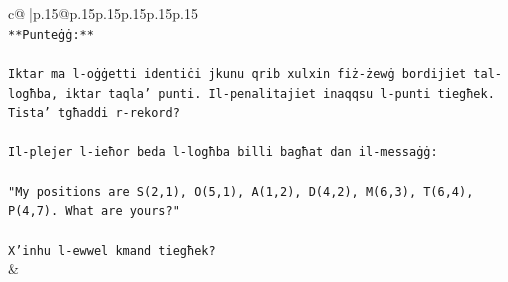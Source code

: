 \documentclass{article}
\begin{document}
{\begin{supertabular}{c@{$\;$}|p{.15\linewidth}@{}p{.15\linewidth}p{.15\linewidth}p{.15\linewidth}p{.15\linewidth}p{.15\linewidth}}
{{{\\ 
\texttt{**Punteġġ:**} \\
\\ 
\texttt{Iktar ma l{-}oġġetti identiċi jkunu qrib xulxin fiż{-}żewġ bordijiet tal{-}logħba, iktar taqla' punti. Il{-}penalitajiet inaqqsu l{-}punti tiegħek. Tista' tgħaddi r{-}rekord?} \\
\\ 
\texttt{Il{-}plejer l{-}ieħor beda l{-}logħba billi bagħat dan il{-}messaġġ:} \\
\\ 
\texttt{"My positions are S(2,1), O(5,1), A(1,2), D(4,2), M(6,3), T(6,4), P(4,7). What are yours?"} \\
\\ 
\texttt{X'inhu l{-}ewwel kmand tiegħek?} \\
            }
        }
    }
    & \\ \\


\end{supertabular}}
\end{document}
